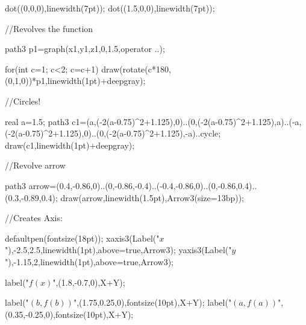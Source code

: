         dot((0,0,0),linewidth(7pt));
        dot((1.5,0,0),linewidth(7pt));
        
    //Revolves the function
    
        
		path3 p1=graph(x1,y1,z1,0,1.5,operator ..);
        
        for(int c=1; c<2; c=c+1)
        {
        	draw(rotate(c*180,(0,1,0))*p1,linewidth(1pt)+deepgray);
        }
    	
	//Circles!
    
		real a=1.5;
		path3 c1=(a,(-2(a-0.75)^2+1.125),0)..(0,(-2(a-0.75)^2+1.125),a)..(-a,(-2(a-0.75)^2+1.125),0)..(0,(-2(a-0.75)^2+1.125),-a)..cycle;
    	draw(c1,linewidth(1pt)+deepgray);

        
    //Revolve arrow
        
    	path3 arrow=(0.4,-0.86,0)..(0,-0.86,-0.4)..(-0.4,-0.86,0)..(0,-0.86,0.4)..(0.3,-0.89,0.4);
		draw(arrow,linewidth(1.5pt),Arrow3(size=13bp));

	//Creates Axis:

    defaultpen(fontsize(18pt));
    xaxis3(Label("$x$"),-2.5,2.5,linewidth(1pt),above=true,Arrow3);
    yaxis3(Label("$y$"),-1.15,2,linewidth(1pt),above=true,Arrow3);
    
    label("$f(x)$",(1.8,-0.7,0),X+Y);
    
    label("$(b,f(b))$",(1.75,0.25,0),fontsize(10pt),X+Y);
    label("$(a,f(a))$",(0.35,-0.25,0),fontsize(10pt),X+Y);


    
